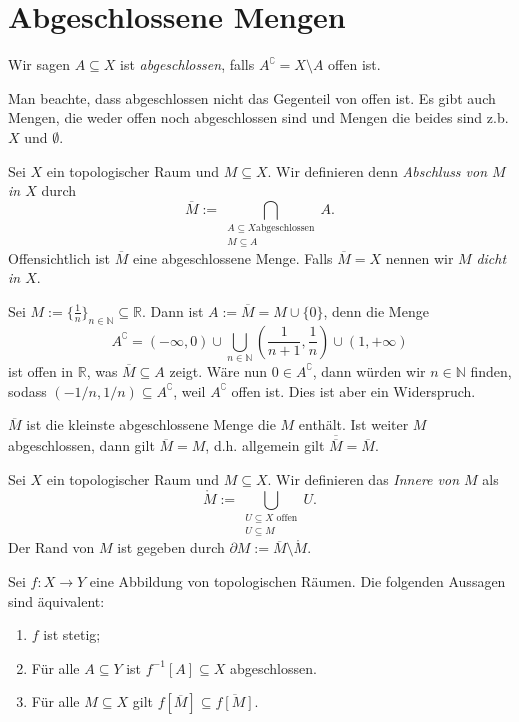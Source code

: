 \documentclass[
12pt, 
openany, 
a4paper, 
final,
fleqn, 
]{myclass}
\numberwithin{equation}{chapter}
\numberwithin{section}{chapter}
\newcommand{\NN}{\mathbb N}
\newcommand{\RR}{\mathbb R}
\newcommand{\union}{\bigcup}
\newcommand{\closure}[1]{\overline{#1}}
\newcommand{\TFAE}{Die folgenden Aussagen sind äquivalent}
\begin{document}
\section{Abgeschlossene Mengen}
\begin{defn}
Wir sagen $A\subseteq X$ ist \emph{abgeschlossen}, falls $A^\complement= X\setminus A$ offen ist. 
\end{defn}
Man beachte, dass abgeschlossen nicht das Gegenteil von offen ist. Es gibt auch Mengen, die weder offen noch abgeschlossen sind und Mengen die beides sind z.b. $X$ und $\emptyset$. 
\begin{defn}
Sei $X$ ein topologischer Raum und $M\subseteq X$. Wir definieren denn \emph{Abschluss von $M$ in $X$} durch 
\[
\closure{M} := \bigcap_{\substack{A \subseteq X\text {abgeschlossen}\\ M\subseteq A}} A. 
\]
Offensichtlich ist $\closure{M}$ eine abgeschlossene Menge. Falls $\closure M = X$ nennen wir $M$ \emph{dicht in $X$}.
\end{defn}
\begin{eg}\label{1.24}
Sei $ M := \{\frac{1}{n}\}_{n\in\NN} \subseteq \RR$. Dann ist $ A:=\closure{M} = M\cup \{0\} $, denn die Menge
\[
A^{\complement} = (-\infty, 0) \cup \union_{n\in \NN}\left(\frac{1}{n+1}, \frac{1}{n}\right) \cup (1, +\infty)
\]
ist offen in $ \RR $, was $ \closure{M} \subseteq A $ zeigt. Wäre nun $ 0\in A^{\complement} $, dann würden wir $n\in \NN$  finden, sodass $ (-1/n, 1/n)\subseteq A^{\complement} $, weil $A^{\complement}$ offen ist. Dies ist aber ein Widerspruch. 
\end{eg}
\begin{rmk}
$\closure M$ ist die kleinste abgeschlossene Menge die $M$ enthält. Ist weiter $M$ abgeschlossen, dann gilt $\closure{M} = M$, d.h. allgemein gilt $\closure{\closure{M}}= \closure{M}$.
\end{rmk}
\begin{defn}\label{1.25}
Sei $X$ ein topologischer Raum und $M\subseteq X$. Wir definieren das \emph{Innere von $M$} als 
\[
\mathring{M} := \union_{\substack{U \subseteq X \text{ offen}\\ U \subseteq M}} U.
\]
Der Rand von $M$ ist gegeben durch $\partial M := \closure{M} \setminus \mathring{M}$.
\end{defn}
\begin{thr}\label{1.26}
Sei $f: X \to Y$ eine Abbildung von topologischen Räumen. {\TFAE}: 
\begin{enumerate}[label=(\arabic*)]
\item\label{1.26, i} $f$ ist stetig; 
\item\label{1.26, ii} Für alle $A\subseteq Y$ ist $f^{-1}[A]\subseteq X$ abgeschlossen.
\item\label{1.26, iii} Für alle $M \subseteq X$ gilt $f[\closure M]\subseteq \closure{f[M]}$. 
\end{enumerate}
\end{thr}
\end{document}
